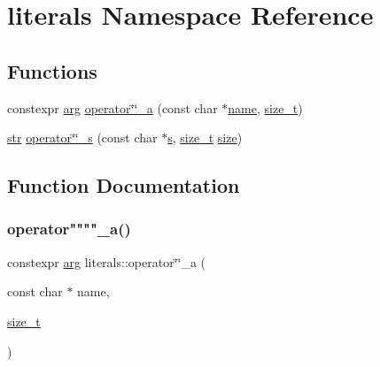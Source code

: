 \hypertarget{namespaceliterals}{}\section{literals Namespace Reference}
\label{namespaceliterals}
\subsection*{Functions}
\begin{DoxyCompactItemize}
\item 
constexpr \mbox{\hyperlink{structarg}{arg}} \mbox{\hyperlink{namespaceliterals_aeade6773ae4649d485c790a1eb9dc729}{operator\char`\"{}\char`\"{}\+\_\+a}} (const char $\ast$\mbox{\hyperlink{structname}{name}}, \mbox{\hyperlink{detail_2common_8h_a801d6a451a01953ef8cbae6feb6a3638}{size\+\_\+t}})
\item 
\mbox{\hyperlink{classstr}{str}} \mbox{\hyperlink{namespaceliterals_a8f086b5001169e61bd9260ee9f6978f9}{operator\char`\"{}\char`\"{}\+\_\+s}} (const char $\ast$\mbox{\hyperlink{_s_d_l__opengl_8h_a4af680a6c683f88ed67b76f207f2e6e4}{s}}, \mbox{\hyperlink{detail_2common_8h_a801d6a451a01953ef8cbae6feb6a3638}{size\+\_\+t}} \mbox{\hyperlink{_s_d_l__opengl__glext_8h_a3d1e3edfcf61ca2d831883e1afbad89e}{size}})
\end{DoxyCompactItemize}


\subsection{Function Documentation}
\mbox{\label{namespaceliterals_aeade6773ae4649d485c790a1eb9dc729}} 
\subsubsection{\texorpdfstring{operator""""\_a()}{operator""\_a()}}
{\footnotesize\ttfamily constexpr \mbox{\hyperlink{structarg}{arg}} literals\+::operator\char`\"{}\char`\"{}\+\_\+a (\begin{DoxyParamCaption}\item[{const char $\ast$}]{name,  }\item[{\mbox{\hyperlink{detail_2common_8h_a801d6a451a01953ef8cbae6feb6a3638}{size\+\_\+t}}}]{ }\end{DoxyParamCaption})}

